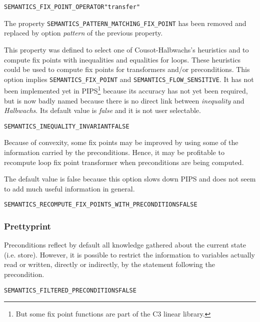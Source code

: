 \documentclass[a4paper]{report}
\newenvironment{PipsProp}{\begin{alltt}}{\end{alltt}}
\begin{document}
\begin{PipsProp}
SEMANTICS_FIX_POINT_OPERATOR "transfer"
\end{PipsProp}

The property \verb+SEMANTICS_PATTERN_MATCHING_FIX_POINT+ has been removed
and replaced by option {\em pattern} of the previous property.

This property was defined to select one of Cousot-Halbwachs's heuristics
and to compute fix points with inequalities and equalities for loops.
These heuristics could be used to compute fix points for transformers
and/or preconditions. This option implies \texttt{SEMANTICS\_FIX\_POINT} and
\texttt{SEMANTICS\_FLOW\_SENSITIVE}.  It has not been implemented yet in
PIPS\footnote{But some fix point functions are part of the C3 linear
  library.} because its accuracy has not yet been required, but is now
badly named because there is no direct link between {\em inequality} and
{\em Halbwachs}. Its default value is {\em false} and it is not user
selectable.

\begin{PipsProp}
SEMANTICS_INEQUALITY_INVARIANT FALSE
\end{PipsProp}

Because of convexity, some fix points may be improved by using some of the
information carried by the preconditions. Hence, it may be profitable to
recompute loop fix point transformer when preconditions are being
computed.

The default value is false because this option slows down PIPS and does
not seem to add much useful information in general.

\begin{PipsProp}
SEMANTICS_RECOMPUTE_FIX_POINTS_WITH_PRECONDITIONS FALSE
\end{PipsProp}

\subsubsection{Prettyprint}

Preconditions reflect by default all knowledge gathered about the current
state (i.e. store). However, it is possible to restrict the information to
variables actually read or written, directly or indirectly, by the
statement following the precondition.

\begin{PipsProp}
SEMANTICS_FILTERED_PRECONDITIONS FALSE
\end{PipsProp}
\end{document}
